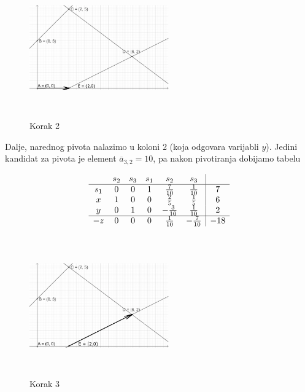 \documentclass[a4paper, utf8, 11pt, colorlinks]{book}
\begin{document}
\begin{figure}[!ht]
	\centering
	\includegraphics[width=170pt, height=170pt]{simpleks-primjer-2-sl2.eps}
	\caption{Korak 2}
	\label{fig:step-2}
\end{figure}
Dalje, narednog pivota nalazimo u koloni 2 (koja odgovara varijabli $y$). Jedini kandidat za pivota je element $\overline{a}_{3, 2}= 10$, pa nakon pivotiranja dobijamo tabelu 

$$\begin{array}{cccccc| c}
	& s_2  & s_3   & s_1  & s_2 & s_3 &     \\ \hline
s_1 & 0    &  0    & 1    &  \frac{7}{10}  & \frac{1}{10} &   7  \\  
x   & 1    &  0    & 0    &  \frac{2}{5}   & \frac{1}{5}  &   6  \\
y   & 0    &  1    & 0    & - \frac{3}{10}  & \frac{1}{10} &   2  \\ \hline
-z  & 0    &  0    & 0    &   \frac{1}{10} &-\frac{7}{10}  &  -18 \\ 
\end{array}
$$ 

\begin{figure}[H]
	\centering
	\includegraphics[width=170pt, height=170pt]{simpleks-primjer-2-sl3.eps}
	\caption{Korak 3}
	\label{fig:step-3}
\end{figure}
\end{document}

